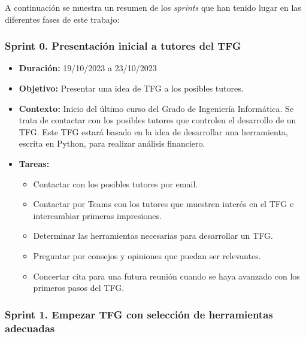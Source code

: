 A continuación se muestra un resumen de los \emph{sprints} que han tenido lugar en las diferentes fases de este trabajo:


\subsubsection{Sprint 0. Presentación inicial a tutores del TFG}


\begin{itemize}
\item  
\textbf{Duración:} 19/10/2023 a 23/10/2023

\item
\textbf{Objetivo:} Presentar una idea de TFG a los posibles tutores. 

\item
\textbf{Contexto:} Inicio del último curso del Grado de Ingeniería Informática. Se trata de contactar con los posibles tutores que controlen el desarrollo de un TFG. Este TFG estará basado en la idea de desarrollar una herramienta, escrita en Python, para realizar análisis financiero. 

\item
\textbf{Tareas:}
	\begin{itemize}
	\tightlist
	\item 
	Contactar con los posibles tutores por email.
	\item
	Contactar por Teams con los tutores que muestren interés en el TFG e intercambiar primeras impresiones.
	\item
	Determinar las herramientas necesarias para desarrollar un TFG.
	\item
	Preguntar por consejos y opiniones que puedan ser relevantes. 
	\item
	Concertar cita para una futura reunión cuando se haya avanzado con los primeros pasos del TFG.
	\end{itemize}
\end{itemize}



\subsubsection{Sprint 1. Empezar TFG con selección de herramientas adecuadas}


